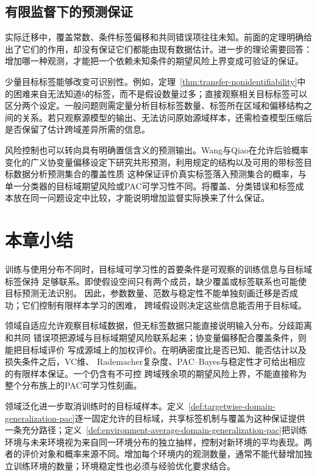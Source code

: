 \subsection{有限监督下的预测保证}
\label{sec:transfer-frontier-identifiability}

实际迁移中，覆盖常数、条件标签偏移和共同错误项往往未知。前面的定理明确给出了它们的作用，却没有保证它们都能由现有数据估计。进一步的理论需要回答：增加哪一种观测，才能把一个依赖未知条件的期望风险上界变成可验证的保证。

少量目标标签能够改变可识别性。例如，定理~\ref{thm:transfer-nonidentifiability}中的困难来自无法知道$b$的标签，而不是假设数量过多；直接观察相关目标标签可以区分两个设定。一般问题则需定量分析目标标签数量、标签所在区域和偏移结构之间的关系。若只观察源模型的输出、无法访问原始源域样本，还需检查模型压缩后是否保留了估计跨域差异所需的信息。

风险控制也可以转向具有明确置信含义的预测输出。Wang与Qiao在允许后验概率变化的广义协变量偏移设定下研究共形预测，利用规定的结构以及可用的带标签目标数据分析预测集合的覆盖性质 这种保证评价真实标签落入预测集合的概率，与单一分类器的目标域期望风险或PAC可学习性不同。将覆盖、分类错误和标签成本放在同一问题设定中比较，才能说明增加监督实际换来了什么保证。

\section{本章小结}
\label{sec:transfer-learning-summary}

训练与使用分布不同时，目标域可学习性的首要条件是可观察的训练信息与目标域标签保持
足够联系。即使假设空间只有两个成员，缺少覆盖或标签联系也可能使目标预测无法识别。
因此，参数数量、范数与稳定性不能单独刻画迁移是否成功；它们控制有限样本学习的困难，
跨域假设则决定这些信息能否用于目标域。

领域自适应允许观察目标域数据，但无标签数据只能直接说明输入分布。分歧距离和共同
错误项把源域与目标域期望风险联系起来；协变量偏移配合覆盖条件，则能把目标域评价
写成源域上的加权评价。在明确密度比是否已知、能否估计以及损失条件之后，VC维、
Rademacher复杂度、PAC--Bayes与稳定性才可给出相应的有限样本保证。一个仍含有不可控
跨域残余项的期望风险上界，不能直接称为整个分布族上的PAC可学习性刻画。

领域泛化进一步取消训练时的目标域样本。定义~\ref{def:targetwise-domain-generalization-pac}逐一固定允许的目标域，共享标签机制与覆盖为这种保证提供一条充分路径；定义~\ref{def:environment-average-domain-generalization-pac}把训练环境与未来环境视为来自同一环境分布的独立抽样，控制对新环境的平均表现。两者的评价对象和概率来源不同。增加每个环境内的观测数量，通常不能代替增加独立训练环境的数量；环境稳定性也必须与经验优化要求结合。

